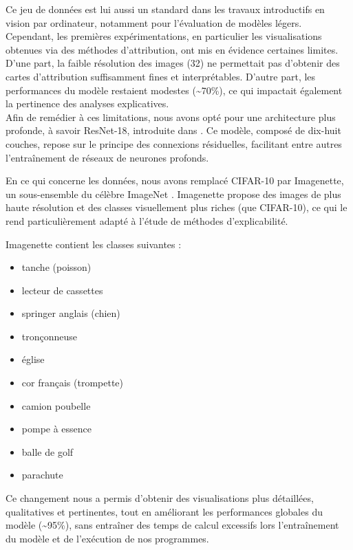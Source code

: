 \documentclass{ir}
\begin{document}
Ce jeu de données est lui aussi un standard dans les travaux introductifs en vision par ordinateur, notamment pour l'évaluation de modèles légers.\\

Cependant, les premières expérimentations, en particulier les visualisations obtenues via des méthodes d'attribution, ont mis en évidence certaines limites.
D'une part, la faible résolution des images (32) ne permettait pas d'obtenir des cartes d'attribution suffisamment fines et interprétables.
D'autre part, les performances du modèle restaient modestes (\textasciitilde 70\%), ce qui impactait également la pertinence des analyses explicatives.\\

Afin de remédier à ces limitations, nous avons opté pour une architecture plus profonde, à savoir ResNet-18, introduite dans \cite{DeepResidualLearningForImageRecognition}.
Ce modèle, composé de dix-huit couches, repose sur le principe des connexions résiduelles, facilitant entre autres l'entraînement de réseaux de neurones profonds.

En ce qui concerne les données, nous avons remplacé CIFAR-10 par Imagenette, un sous-ensemble du célèbre ImageNet \cite{deng09imagenet}.
Imagenette propose des images de plus haute résolution et des classes visuellement plus riches (que CIFAR-10), ce qui le rend particulièrement adapté à l'étude de méthodes d'explicabilité.

Imagenette contient les classes suivantes :
\begin{itemize}
    \item tanche (poisson)
    \item lecteur de cassettes
    \item springer anglais (chien)
    \item tronçonneuse
    \item église
    \item cor français (trompette)
    \item camion poubelle
    \item pompe à essence
    \item balle de golf
    \item parachute\\
\end{itemize}

Ce changement nous a permis d'obtenir des visualisations plus détaillées, qualitatives et pertinentes, tout en améliorant les performances globales du modèle (\textasciitilde 95\%), sans entraîner des temps de calcul excessifs lors l'entraînement du modèle et de l'exécution de nos programmes.
\end{document}
